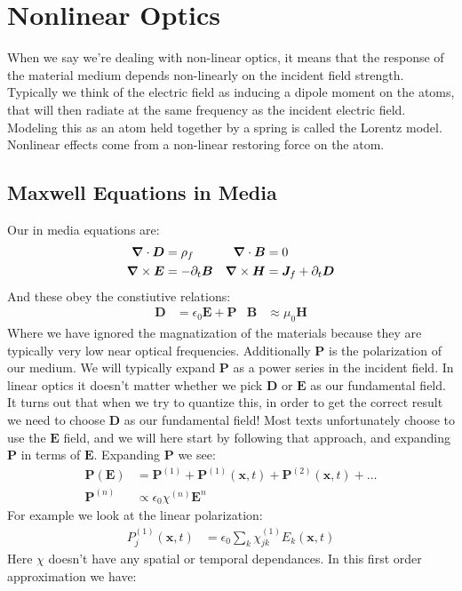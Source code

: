 \section{Nonlinear Optics}
When we say we're dealing with non-linear optics, it means that the response of the material medium depends non-linearly on the incident field strength.
Typically we think of the electric field as inducing a dipole moment on the atoms, that will then radiate at the same frequency as the incident electric field.
Modeling this as an atom held together by a spring is called the Lorentz model.
Nonlinear effects come from a non-linear restoring force on the atom.
\subsection{Maxwell Equations in Media}
Our in media equations are:
\begin{align*}
	\bm{\nabla}\cdot\bm{D} &= \rho_f & \bm{\nabla}\cdot\bm{B} &= 0 \\
	\bm{\nabla}\times\bm{E} &= -\partial_t \bm{B} & \bm{\nabla}\times\bm{H} &= \bm{J}_f + \partial_t \bm{D}
\end{align*}
And these obey the constiutive relations:
\begin{align*}
	\bm{D} &= \epsilon_0\bm{E} + \bm{P} & \bm{B} &\approx \mu_0\bm{H}
\end{align*}
Where we have ignored the magnatization of the materials because they are typically very low near optical frequencies. Additionally $\bm{P}$ is the polarization of our medium.
We will typically expand $\bm{P}$ as a power series in the incident field. In linear optics it doesn't matter whether we pick $\bm{D}$ or $\bm{E}$ as our fundamental field.
It turns out that when we try to quantize this, in order to get the correct result we need to choose $\bm{D}$ as our fundamental field!
Most texts unfortunately choose to use the $\bm{E}$ field, and we will here start by following that approach, and expanding $\bm{P}$ in terms of $\bm{E}$.
Expanding $\bm{P}$ we see:
\begin{align*}
	\bm{P}(\bm{E}) &= \bm{P}^{(1)} + \bm{P}^{(1)}(\bm{x},t) + \bm{P}^{(2)}(\bm{x},t) + \ldots \\
	\bm{P}^{(n)} &\propto \epsilon_0 \chi^{(n)} \bm{E}^n
\end{align*}
For example we look at the linear polarization:
\begin{align*}
	P^{(1)}_j(\bm{x},t) &= \epsilon_0\sum_k \chi_{jk}^{(1)} E_k(\bm{x},t)
\end{align*}
Here $\chi$ doesn't have any spatial or temporal dependances. In this first order approximation we have:
